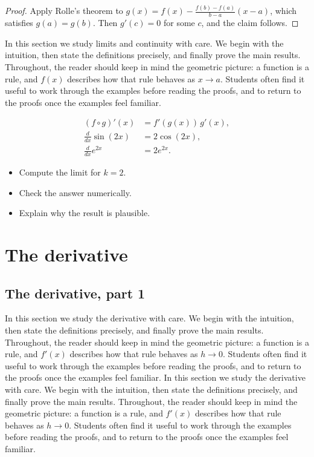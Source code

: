 \documentclass[11pt]{article}
\begin{document}
\begin{proof}
Apply Rolle's theorem to $g(x) = f(x) - \frac{f(b)-f(a)}{b-a}(x-a)$, which satisfies $g(a) = g(b)$. Then $g'(c) = 0$ for some $c$, and the claim follows.
\end{proof}

In this section we study limits and continuity with care. We begin with the intuition, then state the definitions precisely, and finally prove the main results. Throughout, the reader should keep in mind the geometric picture: a function is a rule, and $f(x)$ describes how that rule behaves as $x \to a$. Students often find it useful to work through the examples before reading the proofs, and to return to the proofs once the examples feel familiar. 

\begin{align*}
  (f \circ g)'(x) &= f'(g(x))\, g'(x), \\
  \frac{d}{dx} \sin(2 x) &= 2 \cos(2 x), \\
  \frac{d}{dx} e^{2 x} &= 2 e^{2 x}.
\end{align*}

\begin{itemize}
  \item Compute the limit for $k = 2$.
  \item Check the answer numerically.
  \item Explain why the result is plausible.
\end{itemize}

\section{The derivative}

\subsection{The derivative, part 1}

In this section we study the derivative with care. We begin with the intuition, then state the definitions precisely, and finally prove the main results. Throughout, the reader should keep in mind the geometric picture: a function is a rule, and $f'(x)$ describes how that rule behaves as $h \to 0$. Students often find it useful to work through the examples before reading the proofs, and to return to the proofs once the examples feel familiar. In this section we study the derivative with care. We begin with the intuition, then state the definitions precisely, and finally prove the main results. Throughout, the reader should keep in mind the geometric picture: a function is a rule, and $f'(x)$ describes how that rule behaves as $h \to 0$. Students often find it useful to work through the examples before reading the proofs, and to return to the proofs once the examples feel familiar. 
\end{document}
